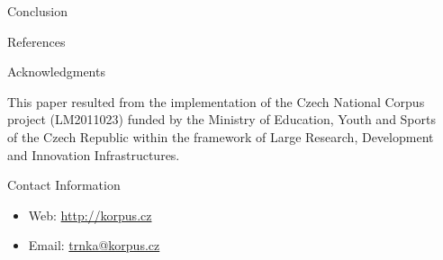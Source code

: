 \documentclass[final,hyperref={pdfpagelabels=false}]{beamer}
\begin{document}
\begin{frame}[t]
\begin{columns}[t]
\begin{column}{.465\textwidth}
\begin{mtblock}{Conclusion}
\end{mtblock}


\begin{ctblock}{References}

\nocite{*} %
\small{
}

\end{ctblock}


\begin{ctblock}{Acknowledgments}

  {\small This paper resulted from the implementation of the Czech National
    Corpus project (LM2011023) funded by the Ministry of Education, Youth and
    Sports of the Czech Republic within the framework of Large Research,
    Development and Innovation Infrastructures.}

\end{ctblock}



\begin{ctblock}{Contact Information}

\begin{itemize}
\item Web: \url{http://korpus.cz}
\item Email: \href{mailto:trnka@korpus.cz}{trnka@korpus.cz}
\end{itemize}

\end{ctblock}


\end{column} %

\begin{column}{.025\textwidth}\end{column} %

\end{columns} %

\end{frame}
\end{document}

